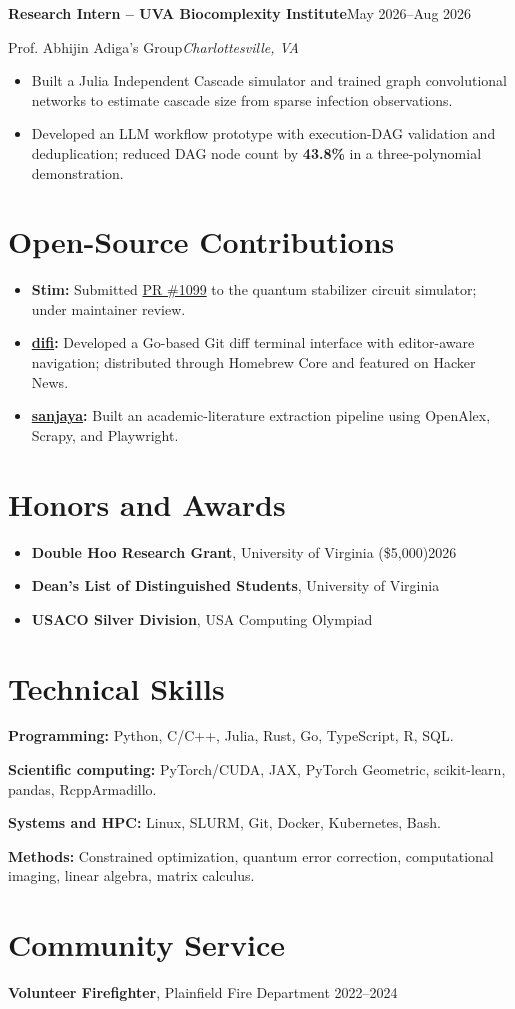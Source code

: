 \documentclass[11pt, letterpaper]{article}
\newenvironment{cvitemize}{
    \begin{itemize}[leftmargin=0.18in, label=\textbullet,
        itemsep=2pt, parsep=0pt, topsep=3pt]
}{\end{itemize}}
\newcommand{\cvheading}[4]{
    \needspace{5\baselineskip}
    \textbf{#1}\hfill #2\par
    \nopagebreak
    #3\hfill\textit{#4}\par
    \nopagebreak
}
\begin{document}
\vspace{5pt}
\cvheading{Research Intern -- UVA Biocomplexity Institute}{May 2026--Aug 2026}
    {Prof. Abhijin Adiga's Group}{Charlottesville, VA}
\begin{cvitemize}
    \item Built a Julia Independent Cascade simulator and trained
    graph convolutional networks to estimate cascade size from sparse
    infection observations.
    \item Developed an LLM workflow prototype with execution-DAG
    validation and deduplication; reduced DAG node count by
    \textbf{43.8\%} in a three-polynomial demonstration.
\end{cvitemize}

\section{Open-Source Contributions}
\begin{cvitemize}
    \item \textbf{Stim:} Submitted
    \href{https://github.com/quantumlib/Stim/pull/1099}{PR \#1099}
    to the quantum stabilizer circuit simulator; under maintainer review.
    \item \textbf{\href{https://github.com/xguot/difi}{difi}:}
    Developed a Go-based Git diff terminal interface with editor-aware
    navigation; distributed through Homebrew Core and featured on Hacker News.
    \item \textbf{\href{https://github.com/xguot/sanjaya}{sanjaya}:}
    Built an academic-literature extraction pipeline using OpenAlex,
    Scrapy, and Playwright.
\end{cvitemize}

\section{Honors and Awards}
\begin{cvitemize}
    \item \textbf{Double Hoo Research Grant}, University of Virginia
    (\$5,000)\hfill 2026
    \item \textbf{Dean's List of Distinguished Students}, University of Virginia
    \item \textbf{USACO Silver Division}, USA Computing Olympiad
\end{cvitemize}

\section{Technical Skills}
\textbf{Programming:} Python, C/C++, Julia, Rust, Go, TypeScript, R, SQL.\par
\textbf{Scientific computing:} PyTorch/CUDA, JAX, PyTorch Geometric,
scikit-learn, pandas, RcppArmadillo.\par
\textbf{Systems and HPC:} Linux, SLURM, Git, Docker, Kubernetes, Bash.\par
\textbf{Methods:} Constrained optimization, quantum error correction,
computational imaging, linear algebra, matrix calculus.

\section{Community Service}
\textbf{Volunteer Firefighter}, Plainfield Fire Department
\hfill 2022--2024
\end{document}
